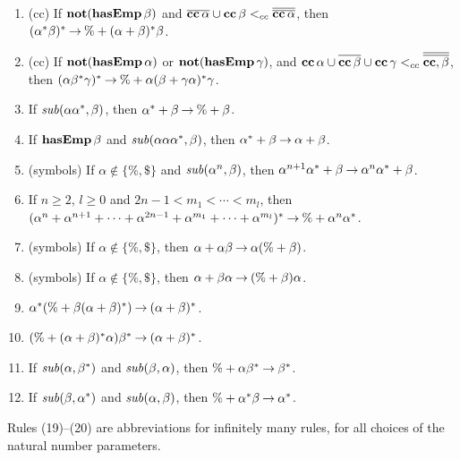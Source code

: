 \begin{enumerate}[\quad(1)]
\item (cc) If $\mathbf{not}(\mathbf{hasEmp}\,\beta)$ and $\overline{\mathbf{cc}\,\alpha} \cup
  \mathbf{cc}\,\beta \mathrel{<_{cc}} \overline{\overline{\mathbf{cc}\,\alpha}}$, then
  $(\alpha^*\beta)^* \mathbin{\to} \% + (\alpha+\beta)^*\beta$.

\item (cc) If $\mathbf{not}(\mathbf{hasEmp}\,\alpha)$ or $\mathbf{not}(\mathbf{hasEmp}\,\gamma)$, and
  $\mathbf{cc}\,\alpha \cup \overline{\mathbf{cc}\,\beta} \cup \mathbf{cc}\,\gamma \mathrel{<_{cc}}
  \overline{\overline{\mathbf{cc},\beta}}$, then $(\alpha\beta^*\gamma)^*
  \mathbin{\to} \% + \alpha(\beta + \gamma\alpha)^*\gamma$.

\item If ${\it sub}(\alpha\alpha^*,\beta)$, then $\alpha^*+\beta \mathbin{\to} \% +
  \beta$.

\item If $\mathbf{hasEmp}\,\beta$ and ${\it sub}(\alpha\alpha\alpha^*, \beta)$,
  then $\alpha^* + \beta \mathbin{\to} \alpha + \beta$.

\item (symbols) If $\alpha\not\in\{\%,\$\}$ and ${\it sub}(\alpha^n, \beta)$, then
  $\alpha^{n+1}\alpha^* + \beta \mathbin{\to} \alpha^n\alpha^* + \beta$.

\item If $n\geq 2$, $l\geq 0$ and $2n - 1 < m_1 < \cdots < m_l$, then
  $(\alpha^n + \alpha^{n+1} + \cdots + \alpha^{2n - 1} + \alpha^{m_1}
  + \cdots + \alpha^{m_l})^* \mathbin{\to} \% + \alpha^n\alpha^*$.

\item (symbols) If $\alpha\not\in\{\%,\$\}$, then $\alpha+\alpha\beta
  \mathbin{\to} \alpha(\%+\beta)$.

\item (symbols) If $\alpha\not\in\{\%,\$\}$, then $\alpha+\beta\alpha
  \mathbin{\to} (\%+\beta)\alpha$.

\item $\alpha^*(\% + \beta(\alpha+\beta)^*) \mathbin{\to} (\alpha+\beta)^*$.

\item $(\% + (\alpha+\beta)^*\alpha)\beta^* \mathbin{\to} (\alpha+\beta)^*$.

\item If ${\it sub}(\alpha, \beta^*)$ and ${\it sub}(\beta, \alpha)$, then
   $\% + \alpha\beta^* \mathbin{\to} \beta^*$.

\item If ${\it sub}(\beta, \alpha^*)$ and ${\it sub}(\alpha, \beta)$, then
   $\% + \alpha^* \beta \mathbin{\to} \alpha^*$.
\end{enumerate}

Rules (19)--(20) are abbreviations for infinitely many rules,
for all choices of the natural number parameters.

